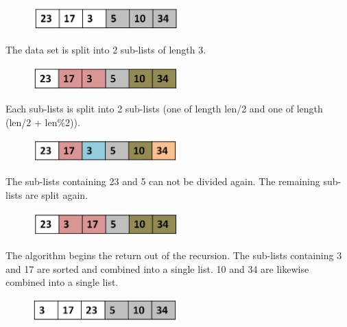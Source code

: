 \begin{figure}[H]
\centering
\includegraphics[width=0.5\textwidth]{pictures/merge2.png}
\label{fig:merge2}
\end{figure}

The data set is split into 2 sub-lists of length 3.

\begin{figure}[H]
\centering
\includegraphics[width=0.5\textwidth]{pictures/merge3.png}
\label{fig:merge3}
\end{figure}

Each sub-lists is  split into 2 sub-lists (one of length len/2 and one of length (len/2 + len\%2)). 

\begin{figure}[H]
\centering
\includegraphics[width=0.5\textwidth]{pictures/merge4.png}
\label{fig:merge4}
\end{figure}

The sub-lists containing 23 and 5 can not be divided again. The remaining sub-lists are split again.

\begin{figure}[H]
\centering
\includegraphics[width=0.5\textwidth]{pictures/merge5.png}
\label{fig:merge5}
\end{figure}

The algorithm begins the return out of the recursion.  The sub-lists containing 3 and 17 are sorted and combined into a single list. 10 and 34 are likewise combined into a single list.

\begin{figure}[H]
\centering
\includegraphics[width=0.5\textwidth]{pictures/merge6.png}
\label{fig:merge6}
\end{figure}

